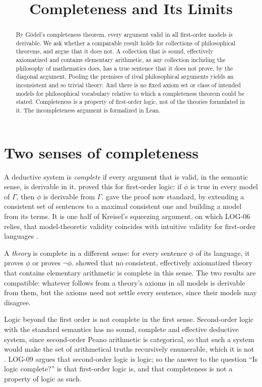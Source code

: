\documentclass{situationist-preprint}
\title{Completeness and Its Limits}
\begin{document}
\maketitle

\begin{abstract}
By G\"odel's completeness theorem, every argument valid in all first-order models is derivable. We ask whether a comparable result holds for collections of philosophical theorems, and argue that it does not. A collection that is sound, effectively axiomatized and contains elementary arithmetic, as any collection including the philosophy of mathematics does, has a true sentence that it does not prove, by the diagonal argument. Pooling the premises of rival philosophical arguments yields an inconsistent and so trivial theory. And there is no fixed axiom set or class of intended models for philosophical vocabulary relative to which a completeness theorem could be stated. Completeness is a property of first-order logic, not of the theories formulated in it. The incompleteness argument is formalized in Lean.
\end{abstract}

\section{Two senses of completeness}

A deductive system is \emph{complete} if every argument that is valid, in the semantic sense, is derivable in it. \citet{Goedel1930} proved this for first-order logic: if $\phi$ is true in every model of $\Gamma$, then $\phi$ is derivable from $\Gamma$. \citet{Henkin1949} gave the proof now standard, by extending a consistent set of sentences to a maximal consistent one and building a model from its terms. It is one half of Kreisel's squeezing argument, on which LOG-06 relies, that model-theoretic validity coincides with intuitive validity for first-order languages \citep{Kreisel1967}.

A \emph{theory} is complete in a different sense: for every sentence $\phi$ of its language, it proves $\phi$ or proves $\neg\phi$. \citet{Goedel1931} showed that no consistent, effectively axiomatized theory that contains elementary arithmetic is complete in this sense. The two results are compatible: whatever follows from a theory's axioms in all models is derivable from them, but the axioms need not settle every sentence, since their models may disagree.

Logic beyond the first order is not complete in the first sense. Second-order logic with the standard semantics has no sound, complete and effective deductive system, since second-order Peano arithmetic is categorical, so that such a system would make the set of arithmetical truths recursively enumerable, which it is not \citep{Shapiro1991}. LOG-09 argues that second-order logic is logic; so the answer to the question \enquote{Is logic complete?} is that first-order logic is, and that completeness is not a property of logic as such.
\end{document}
